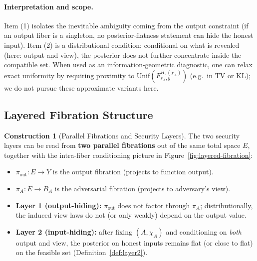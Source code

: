 \documentclass[11pt,a4paper]{article}
\theoremstyle{definition}
\newtheorem{construction}[definition]{Construction}
\theoremstyle{plain}
\begin{document}
\paragraph{Interpretation and scope.}
Item (1) isolates the inevitable ambiguity coming from the output constraint (if an output fiber is a singleton, no posterior-flatness statement can hide the honest input).
Item (2) is a distributional condition: conditional on what is revealed (here: output and view), the posterior does not further concentrate inside the compatible set.
When used as an information-geometric diagnostic, one can relax exact uniformity by requiring proximity to $\mathrm{Unif}(F^{H,(\chi_A)}_{s_A,y})$ (e.g.\ in TV or KL); we do not pursue these approximate variants here.

\subsection{Layered Fibration Structure}
\begin{construction}[Parallel Fibrations and Security Layers]
\label{const:layered-fibration}
The two security layers can be read from \textbf{two parallel fibrations} out of the same total space $E$, together with the intra-fiber conditioning picture in Figure~\ref{fig:layered-fibration}:
\begin{itemize}
    \item $\pi_{\mathrm{out}}: E \to Y$ is the output fibration (projects to function output).
    \item $\pi_A: E \to B_A$ is the adversarial fibration (projects to adversary's view).
    \item \textbf{Layer 1 (output-hiding):} $\pi_{\mathrm{out}}$ does not factor through $\pi_A$; distributionally, the induced view laws do not (or only weakly) depend on the output value.
    \item \textbf{Layer 2 (input-hiding):} after fixing $(A,\chi_A)$ and conditioning on \emph{both} output and view, the posterior on honest inputs remains flat (or close to flat) on the feasible set (Definition~\ref{def:layer2}).
\end{itemize}
\end{construction}
\end{document}
